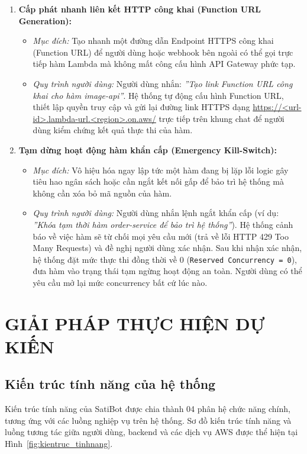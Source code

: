 \documentclass[a4paper,12pt]{article}
\begin{document}
\begin{enumerate}
  \item \textbf{Cấp phát nhanh liên kết HTTP công khai (Function URL Generation):}
  \begin{itemize}
    \item \textit{Mục đích:} Tạo nhanh một đường dẫn Endpoint HTTPS công khai (Function URL) để người dùng hoặc webhook bên ngoài có thể gọi trực tiếp hàm Lambda mà không mất công cấu hình API Gateway phức tạp.
    \item \textit{Quy trình người dùng:} Người dùng nhắn: \textit{''Tạo link Function URL công khai cho hàm image-api''}. Hệ thống tự động cấu hình Function URL, thiết lập quyền truy cập và gửi lại đường link HTTPS dạng \url{https://<url-id>.lambda-url.<region>.on.aws/} trực tiếp trên khung chat để người dùng kiểm chứng kết quả thực thi của hàm.
  \end{itemize}

  \item \textbf{Tạm dừng hoạt động hàm khẩn cấp (Emergency Kill-Switch):}
  \begin{itemize}
    \item \textit{Mục đích:} Vô hiệu hóa ngay lập tức một hàm đang bị lặp lỗi logic gây tiêu hao ngân sách hoặc cần ngắt kết nối gấp để bảo trì hệ thống mà không cần xóa bỏ mã nguồn của hàm.
    \item \textit{Quy trình người dùng:} Người dùng nhắn lệnh ngắt khẩn cấp (ví dụ: \textit{''Khóa tạm thời hàm order-service để bảo trì hệ thống''}). Hệ thống cảnh báo về việc hàm sẽ từ chối mọi yêu cầu mới (trả về lỗi HTTP 429 Too Many Requests) và đề nghị người dùng xác nhận. Sau khi nhận xác nhận, hệ thống đặt mức thực thi đồng thời về 0 (\texttt{Reserved Concurrency = 0}), đưa hàm vào trạng thái tạm ngừng hoạt động an toàn. Người dùng có thể yêu cầu mở lại mức concurrency bất cứ lúc nào.
  \end{itemize}
\end{enumerate}

\clearpage

\section{GIẢI PHÁP THỰC HIỆN DỰ KIẾN}

\subsection{Kiến trúc tính năng của hệ thống}

Kiến trúc tính năng của SatiBot được chia thành 04 phân hệ chức năng chính, tương ứng với các luồng nghiệp vụ trên hệ thống. Sơ đồ kiến trúc tính năng và luồng tương tác giữa người dùng, backend và các dịch vụ AWS được thể hiện tại Hình~\ref{fig:kientruc_tinhnang}.
\end{document}
